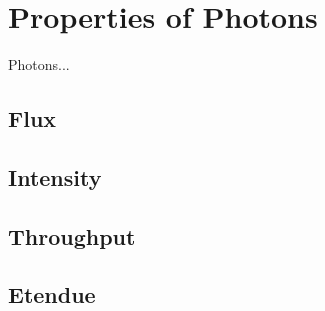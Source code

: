 \vspace{1.3cm}
\section{Properties of Photons}
Photons...
\subsection{Flux}
\subsection{Intensity}
\subsection{Throughput}
\subsection{Etendue}



\vspace{1.3cm}
